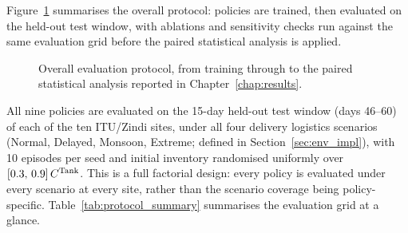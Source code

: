 Figure~\ref{fig:eval_flow} summarises the overall protocol: policies are
trained, then evaluated on the held-out test window, with ablations and
sensitivity checks run against the same evaluation grid before the
paired statistical analysis is applied.

\begin{figure}[htbp]
\centering
{}
\caption{Overall evaluation protocol, from training through to the
paired statistical analysis reported in Chapter~\ref{chap:results}.}
\label{fig:eval_flow}
\end{figure}

All nine policies are evaluated on the 15-day held-out test window (days
46--60) of each of the ten ITU/Zindi sites, under all four delivery
logistics scenarios (Normal, Delayed, Monsoon, Extreme; defined in
Section~\ref{sec:env_impl}), with 10 episodes per seed and initial
inventory randomised uniformly over $[0.3,\,0.9]\,C^{\mathrm{Tank}}$. This is a
full factorial design: every policy is evaluated under every scenario at
every site, rather than the scenario coverage being policy-specific.
Table~\ref{tab:protocol_summary} summarises the evaluation grid at a
glance.

